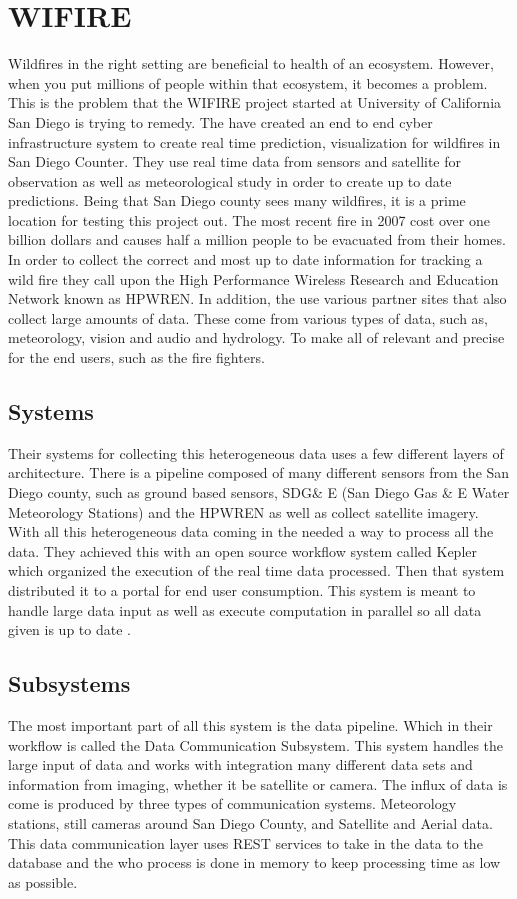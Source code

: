 \documentclass[sigconf]{acmart}
\begin{document}
\section{WIFIRE}
Wildfires in the right setting are beneficial to health of an ecosystem.  However, when you put millions of people within that ecosystem, it becomes a problem.  This is the problem that the WIFIRE project started at University of California San Diego is trying to remedy.   The have created an end to end cyber infrastructure system to create real time prediction, visualization for wildfires in San Diego Counter. They use real time data from sensors and satellite for observation as well as meteorological study in order to create up to date predictions.  Being that San Diego county sees many wildfires, it is a prime location for testing this project out.  The most recent fire in 2007 cost over one billion dollars and causes half a million people to be evacuated from their homes\citep{NPR}. In order to collect the correct and most up to date information for tracking a wild fire they call upon the High Performance Wireless Research and Education Network known as HPWREN.  In addition, the use various partner sites that also collect large amounts of data.  These come from various types of data, such as, meteorology, vision and audio and hydrology.   To make all of relevant and precise for the end users, such as the fire fighters.

\subsection{Systems}
Their systems for collecting this heterogeneous data uses a few different layers of architecture. There is a pipeline composed of many different sensors from the San Diego county, such as ground based sensors, SDG\& E (San Diego Gas \& E Water Meteorology Stations) and the HPWREN as well as collect satellite imagery.  With all this heterogeneous data coming in the needed a way to process all the data.  They achieved this with  an open source workflow system called Kepler which organized the execution of the real time data processed.  Then that system distributed it to a portal for end user consumption.  This system is meant to handle large data input as well as execute computation in parallel so all data given is up to date \cite{ALTINTAS}.

\subsection{Subsystems}
The most important part of all this system is the data pipeline.  Which in their workflow is called the Data Communication Subsystem.  This system handles the large input of data and works with integration many different data sets and information from imaging, whether it be satellite or camera.  The influx of data is come is produced by three types of communication systems.  Meteorology stations, still cameras around San Diego County, and Satellite and Aerial data.  This data communication layer uses REST services to take in the data to the database and the who process is done in memory to keep processing time as low as possible.
\end{document}
